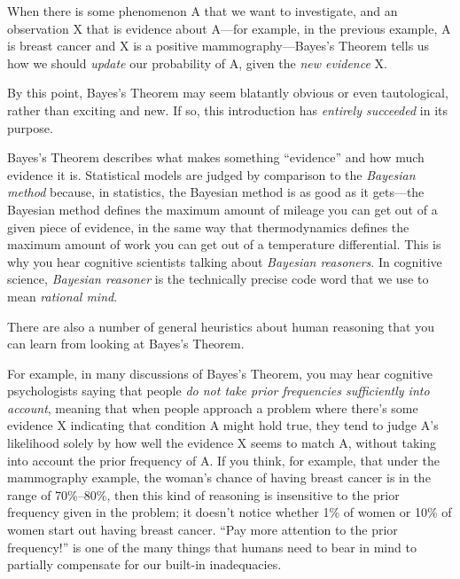 {
 When there is some phenomenon A that we want to investigate, and
an observation X that is evidence about A---for example, in the
previous example, A is breast cancer and X is a positive
mammography---Bayes's Theorem tells us how we should
\textit{update} our probability of A, given the \textit{new evidence}
X.}

{
 By this point, Bayes's Theorem may seem blatantly
obvious or even tautological, rather than exciting and new. If so, this
introduction has \textit{entirely succeeded} in its purpose.}

{
 Bayes's Theorem describes what makes something
``evidence'' and how much evidence
it is. Statistical models are judged by comparison to the
\textit{Bayesian method} because, in statistics, the Bayesian method is
as good as it gets---the Bayesian method defines the maximum amount of
mileage you can get out of a given piece of evidence, in the same way
that thermodynamics defines the maximum amount of work you can get out
of a temperature differential. This is why you hear cognitive
scientists talking about \textit{Bayesian reasoners}. In cognitive
science, \textit{Bayesian reasoner} is the technically precise code
word that we use to mean \textit{rational mind}.}

{
 There are also a number of general heuristics about human
reasoning that you can learn from looking at Bayes's
Theorem.}

{
 For example, in many discussions of Bayes's
Theorem, you may hear cognitive psychologists saying that people
\textit{do not take prior frequencies sufficiently into account},
meaning that when people approach a problem where
there's some evidence X indicating that condition A
might hold true, they tend to judge A's likelihood
solely by how well the evidence X seems to match A, without taking into
account the prior frequency of A. If you think, for example, that under
the mammography example, the woman's chance of having
breast cancer is in the range of 70\%--80\%, then this kind of
reasoning is insensitive to the prior frequency given in the problem;
it doesn't notice whether 1\% of women or 10\% of women
start out having breast cancer. ``Pay more attention
to the prior frequency!'' is one of the many things
that humans need to bear in mind to partially compensate for our
built-in inadequacies.}

